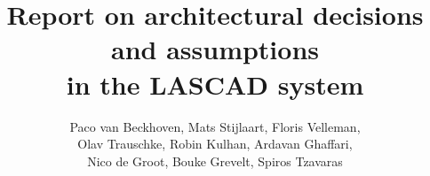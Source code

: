 \documentclass{article}
\title{Report on architectural decisions and assumptions \\ in the LASCAD system}
\author{Paco van Beckhoven, Mats Stijlaart, Floris Velleman,\\ Olav Trauschke, Robin Kulhan, Ardavan Ghaffari, \\Nico de Groot, Bouke Grevelt, Spiros Tzavaras}
\begin{document}
\maketitle







\pagebreak

\pagebreak

\end{document}
